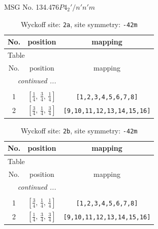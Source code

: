 \documentclass[fleqn,8pt]{jsarticle}
\begin{document}
\setcounter{MaxMatrixCols}{32}

\renewcommand{\tablename}{Table~}
\renewcommand{\figurename}{Figure~}
\begin{center}
\LARGE
MSG No. 134.476\quad$P4_{2}'/n'n'm$
\end{center}
\renewcommand{\arraystretch}{1.2}
\begin{longtable}{ccc}
\caption{Wyckoff site: {\tt 2a}, site symmetry: {\tt -42m}}
 \\
 \hline \hline
No. & position & mapping \\ \hline \endfirsthead

\multicolumn{2}{l}{\tablename\ \thetable{}} \\
 \hline \hline
No. & position & mapping \\ \hline \endhead

 \hline \hline
\multicolumn{2}{r}{\footnotesize\it continued ...} \\ \endfoot

 \hline \hline
\multicolumn{2}{r}{} \\ \endlastfoot

1 & $\left[ \frac{1}{4},\, \frac{3}{4},\, \frac{1}{4} \right]$ & {\tt [1,2,3,4,5,6,7,8]} \\ \hline
2 & $\left[ \frac{3}{4},\, \frac{1}{4},\, \frac{3}{4} \right]$ & {\tt [9,10,11,12,13,14,15,16]} \\
\end{longtable}
\renewcommand{\arraystretch}{1.2}
\begin{longtable}{ccc}
\caption{Wyckoff site: {\tt 2b}, site symmetry: {\tt -42m}}
 \\
 \hline \hline
No. & position & mapping \\ \hline \endfirsthead

\multicolumn{2}{l}{\tablename\ \thetable{}} \\
 \hline \hline
No. & position & mapping \\ \hline \endhead

 \hline \hline
\multicolumn{2}{r}{\footnotesize\it continued ...} \\ \endfoot

 \hline \hline
\multicolumn{2}{r}{} \\ \endlastfoot

1 & $\left[ \frac{3}{4},\, \frac{1}{4},\, \frac{1}{4} \right]$ & {\tt [1,2,3,4,5,6,7,8]} \\ \hline
2 & $\left[ \frac{1}{4},\, \frac{3}{4},\, \frac{3}{4} \right]$ & {\tt [9,10,11,12,13,14,15,16]} \\
\end{longtable}
\end{document}
